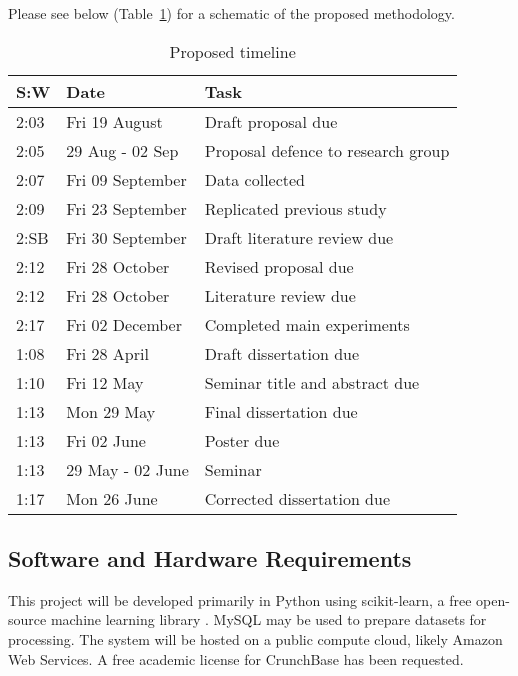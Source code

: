 \documentclass[../thesis/thesis.tex]{subfiles}
\begin{document}
Please see below (Table~\ref{tab:original_proposal:timeline}) for a schematic of the proposed methodology.

\begin{table}[!h]
  \centering
    \begin{tabular}{l|l|l}
    \toprule
    \textbf{S:W} & \textbf{Date} & \textbf{Task} \\
    \midrule
    {2:03} & Fri 19 August & Draft proposal due \\
    {2:05} & 29 Aug - 02 Sep & Proposal defence to research group \\
    {2:07} & Fri 09 September & Data collected \\
    {2:09} & Fri 23 September & Replicated previous study \\
    {2:SB} & Fri 30 September & Draft literature review due \\
    {2:12} & Fri 28 October & Revised proposal due \\
    {2:12} & Fri 28 October & Literature review due \\
    {2:17} & Fri 02 December & Completed main experiments \\
    {1:08} & Fri 28 April & Draft dissertation due \\
    {1:10} & Fri 12 May & Seminar title and abstract due \\
    {1:13} & Mon 29 May & Final dissertation due \\
    {1:13} & Fri 02 June & Poster due \\
    {1:13} & 29 May - 02 June & Seminar \\
    {1:17} & Mon 26 June & Corrected dissertation due \\
    \bottomrule
    \end{tabular}%
  \caption{Proposed timeline}
  \label{tab:original_proposal:timeline}%
\end{table}%

\subsection*{Software and Hardware Requirements}

This project will be developed primarily in Python using scikit-learn, a free open-source machine learning library \cite{scikitlearn}. MySQL may be used to prepare datasets for processing. The system will be hosted on a public compute cloud, likely Amazon Web Services. A free academic license for CrunchBase has been requested.

\end{document}

